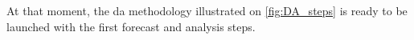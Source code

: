 \documentclass[12pt,twoside]{report}
\newcommand{\Autoref}[1]{%
  \begingroup%
    \def\chapterautorefname{Chapter}%
    \def\sectionautorefname{Section}%
    \def\subsectionautorefname{Subsection}%
    \def\subsubsectionautorefname{Subsubsection}%
    \def\paragraphautorefname{Paragraph}%
    \def\tableautorefname{Table}%
    \def\equationautorefname{Equation}%
    \def\algorithmautorefname{Algorithm}%
    \def\lineautorefname{Step}%
  \autoref{#1}%
  \endgroup%
}
\begin{document}
\vspace*{1cm}

At that moment, the \gls{da} methodology illustrated on \autoref{fig:DA_steps} is ready to be launched with the first forecast and analysis steps. 

\clearpage

%
%
%
%
%
\end{document}
